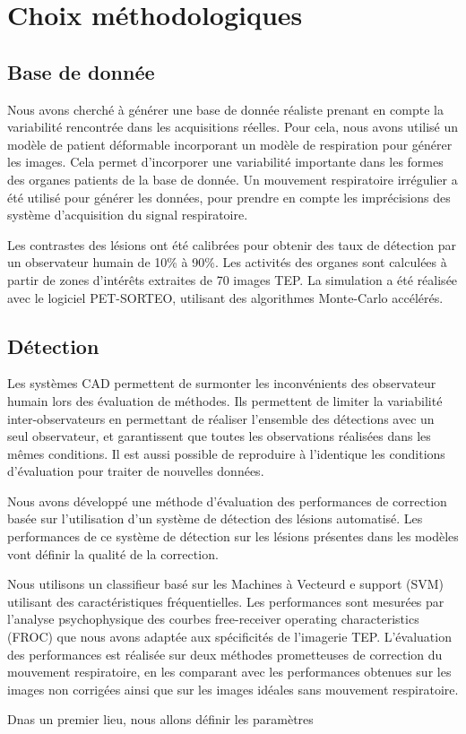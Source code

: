 \chapter{Choix méthodologiques}


\section{Base de donnée}
Nous avons cherché à générer une base de donnée réaliste prenant en compte la variabilité rencontrée dans les acquisitions réelles. Pour cela, nous avons utilisé un modèle de patient déformable incorporant un modèle de respiration pour générer les images. Cela permet d'incorporer une variabilité importante dans les formes des organes patients de la base de donnée. Un mouvement respiratoire irrégulier a été utilisé pour générer les données, pour prendre en compte les imprécisions des système d'acquisition du signal respiratoire. 

Les contrastes des lésions ont été calibrées pour obtenir des taux de détection par un observateur humain de 10\% à 90\%. Les activités des organes sont calculées à partir de zones d'intérêts extraites de 70 images TEP. La simulation a été réalisée avec le logiciel PET-SORTEO, utilisant des algorithmes Monte-Carlo accélérés. 


\section{Détection}


Les systèmes CAD permettent de surmonter les inconvénients des observateur humain lors des évaluation de méthodes. Ils permettent de limiter la variabilité inter-observateurs en permettant de réaliser l'ensemble des détections avec un seul observateur, et garantissent que toutes les observations réalisées dans les mêmes conditions. Il est aussi possible de reproduire à l'identique les conditions d'évaluation pour traiter de nouvelles données.

Nous avons développé une méthode d'évaluation des performances de correction basée sur l'utilisation d'un système de détection des lésions automatisé. Les performances de ce système de détection sur les lésions présentes dans les modèles vont définir la qualité de la correction. 

Nous utilisons un classifieur basé sur les Machines à Vecteurd e support (SVM) utilisant des caractéristiques fréquentielles. Les performances sont mesurées par l’analyse psychophysique des courbes free-receiver operating characteristics (FROC) que nous avons adaptée aux spécificités de l’imagerie TEP. L’évaluation des performances est réalisée sur deux méthodes prometteuses de correction du mouvement respiratoire, en les comparant avec les performances obtenues sur les images non corrigées ainsi que sur les images idéales sans mouvement respiratoire.

Dnas un premier lieu, nous allons définir les paramètres 